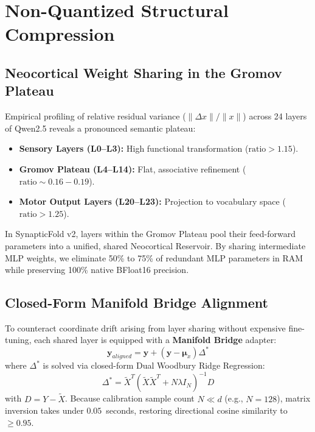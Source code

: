 \documentclass[10pt,journal,compsoc]{IEEEtran}
\theoremstyle{definition}
\begin{document}
\section{Non-Quantized Structural Compression}

\subsection{Neocortical Weight Sharing in the Gromov Plateau}
Empirical profiling of relative residual variance ($\|\Delta x\| / \|x\|$) across 24 layers of Qwen2.5 reveals a pronounced semantic plateau:
\begin{itemize}
    \item \textbf{Sensory Layers (L0--L3):} High functional transformation ($\text{ratio} > 1.15$).
    \item \textbf{Gromov Plateau (L4--L14):} Flat, associative refinement ($\text{ratio} \sim 0.16 - 0.19$).
    \item \textbf{Motor Output Layers (L20--L23):} Projection to vocabulary space ($\text{ratio} > 1.25$).
\end{itemize}

In SynapticFold v2, layers within the Gromov Plateau pool their feed-forward parameters into a unified, shared Neocortical Reservoir. By sharing intermediate MLP weights, we eliminate 50\% to 75\% of redundant MLP parameters in RAM while preserving 100\% native BFloat16 precision.

\subsection{Closed-Form Manifold Bridge Alignment}
To counteract coordinate drift arising from layer sharing without expensive fine-tuning, each shared layer is equipped with a \textbf{Manifold Bridge} adapter:
\begin{equation}
\mathbf{y}_{aligned} = \mathbf{y} + (\mathbf{y} - \boldsymbol{\mu}_x) \Delta^*
\end{equation}
where $\Delta^*$ is solved via closed-form Dual Woodbury Ridge Regression:
\begin{equation}
\Delta^* = \tilde{X}^T (\tilde{X} \tilde{X}^T + N \lambda I_N)^{-1} D
\end{equation}
with $D = Y - \tilde{X}$. Because calibration sample count $N \ll d$ (e.g., $N=128$), matrix inversion takes under $0.05$~seconds, restoring directional cosine similarity to $\ge 0.95$.
\end{document}
